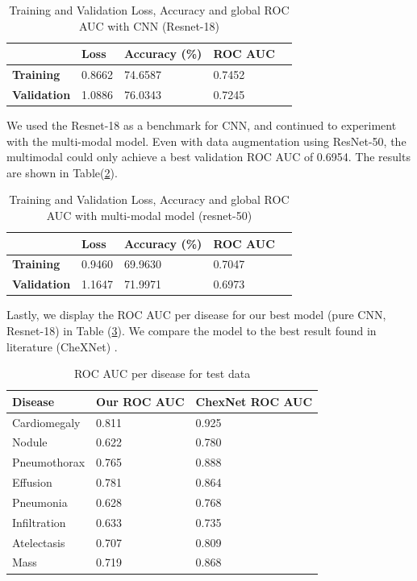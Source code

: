 \documentclass[10pt,letterpaper]{article}
\begin{document}
\begin{table}[!htbp]
\centering
\begin{tabular}{| l | l | l | l | l}
\hline
           & \textbf{Loss}   & \textbf{Accuracy} (\%) & \textbf{ROC AUC} \\ \hline
\textbf{Training}   & 0.8662 & 74.6587       & 0.7452 \\ \hline
\textbf{Validation} & 1.0886 & 76.0343       & 0.7245\\ \hline
\end{tabular}
\caption{Training and Validation Loss, Accuracy and global ROC AUC with CNN (Resnet-18)}
\label{roc}
\end{table}

We used the Resnet-18 as a benchmark for CNN, and continued to experiment with the multi-modal model. Even with data augmentation using ResNet-50, the multimodal could only achieve a best validation ROC AUC of 0.6954. The results are shown in Table(\ref{resnet50}).

\begin{table}[!htbp]
\centering
\begin{tabular}{| l | l | l | l | l}
\hline
           & \textbf{Loss}   & \textbf{Accuracy} (\%) & \textbf{ROC AUC} \\ \hline
\textbf{Training}   & 0.9460 & 69.9630       & 0.7047 \\ \hline
\textbf{Validation} & 1.1647 & 71.9971       & 0.6973\\ \hline
\end{tabular}
\caption{Training and Validation Loss, Accuracy and global ROC AUC with multi-modal  model (resnet-50)}
\label{resnet50}
\end{table}

Lastly, we display the ROC AUC per disease for our best model (pure CNN, Resnet-18) in Table (\ref{perdisease}). We compare the model to the best result found in literature (CheXNet) \cite{1711.05225}. 

\begin{table}[!htbp]
\centering
\begin{tabular}{|l|l|l|}
\hline
\textbf{Disease}      & \textbf{Our ROC AUC} & \textbf{ChexNet ROC AUC} \\ \hline
Cardiomegaly & 0.811 & 0.925\\ \hline
Nodule       & 0.622 & 0.780\\ \hline
Pneumothorax & 0.765 & 0.888\\ \hline
Effusion     & 0.781 & 0.864\\ \hline
Pneumonia    & 0.628 & 0.768\\ \hline
Infiltration & 0.633 & 0.735\\ \hline
Atelectasis  & 0.707 & 0.809\\ \hline
Mass         & 0.719 & 0.868\\ \hline
\end{tabular}
\caption{ROC AUC per disease for test data}
\label{perdisease}
\end{table}
\end{document}
